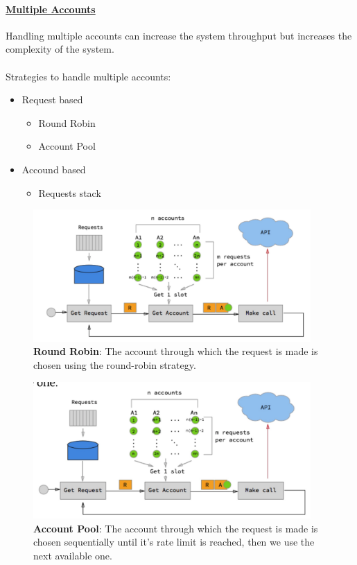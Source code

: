 \documentclass[10pt,a4paper]{article}
\newcommand{\nline}{\\~\\}
\begin{document}
 \paragraph{\uline{Multiple Accounts}} 
Handling multiple accounts can increase the system throughput but increases the complexity of the system.
\nline
Strategies to handle multiple accounts:
\begin{itemize}
	\item Request based
	\begin{itemize}
		\item Round Robin
		\item Account Pool
	\end{itemize}
	\item Accound based
	\begin{itemize}
		\item Requests stack
	\end{itemize}
\end{itemize}
   \begin{figure}[ht!]
 \hfill \includegraphics[width=300pt]{images/multi-account-rr}
 \hspace*{\fill}
 \caption{\textbf{Round Robin}: The account through which the request is made is chosen using the round-robin strategy.}
 \end{figure}
    \begin{figure}[ht!]
 \hfill \includegraphics[width=300pt]{images/multi-account-pool}
 \hspace*{\fill}
 \caption{\textbf{Account Pool}: The account through which the request is made is chosen sequentially until it’s rate limit is reached, then we use the next available one.}
 \end{figure}
\end{document}
